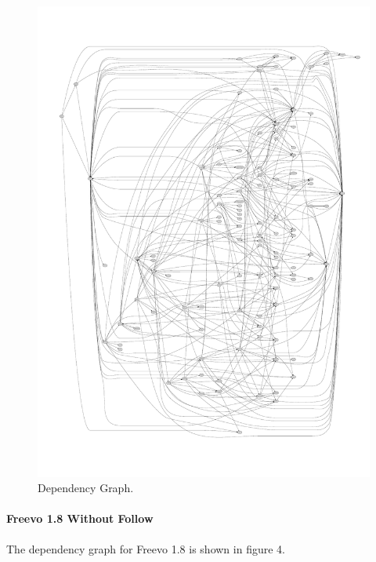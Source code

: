 \documentclass[10.5pt,journal, a4paper]{IEEEtran}
\begin{document}
\begin{figure}[H]
 \centering 
 \includegraphics[width=\columnwidth]{freevo17less}
 \centering 
  \caption {Dependency Graph. }
 \end{figure}


\paragraph{Freevo 1.8 Without Follow}
\noindent
The dependency graph for Freevo 1.8 is shown in figure 4.
\end{document}
